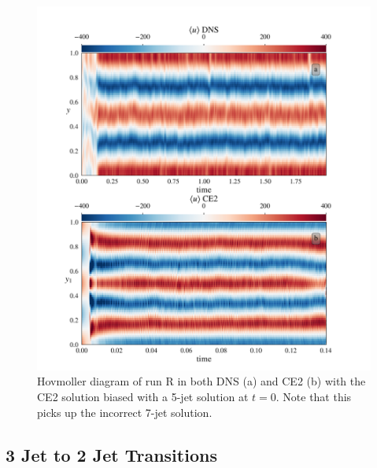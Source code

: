 \documentclass{jfm}
\begin{document}
\begin{figure}[h]
  \centering
  \includegraphics[width=\textwidth]{../../figs/hov_cu_dns_ce2_run_T.pdf}
  \caption{Hovmoller diagram of run R in both DNS (a) and CE2 (b) with the CE2 solution biased with a 5-jet solution at $t=0$. Note that this picks up the incorrect 7-jet solution.}
  \label{fig:hov_run_S}
\end{figure}

\subsection{3 Jet to 2 Jet Transitions}
\label{sec:3->2}
\end{document}
